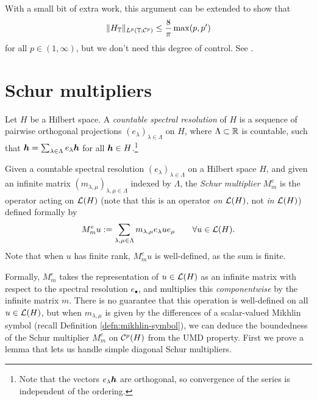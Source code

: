 \begin{rmk}
  With a small bit of extra work, this argument can be extended to show that
  \begin{equation*}
    \|H_{\mathbb{T}}\|_{L^p(\mathbb{T};\mathcal{C}^{p})} \leq \frac{8}{\pi} \max(p,p')
  \end{equation*}
  for all $p \in (1,\infty)$, but we don't need this degree of control.
  See \cite[Proposition 5.4.2]{HNVW16}.
\end{rmk}

\section{Schur multipliers}

Let $H$ be a Hilbert space.
A \emph{countable spectral resolution} of $H$ is a sequence of pairwise orthogonal projections $(e_{\lambda})_{\lambda \in \Lambda}$ on $H$, where $\Lambda \subset \mathbb{R}$ is countable, such that $\bm{h} = \sum_{\lambda \in \Lambda} e_{\lambda} \bm{h}$ for all $\bm{h} \in H$.\footnote{Note that the vectors $e_{\lambda} \bm{h}$ are orthogonal, so convergence of the series is independent of the ordering.}

\begin{defn}
  Given a countable spectral resolution $(e_{\lambda})_{\lambda \in \Lambda}$ on a Hilbert space $H$, and given an infinite matrix $(m_{\lambda,\mu})_{\lambda,\mu \in \Lambda}$ indexed by $\Lambda$, the \emph{Schur multiplier} $M_{m}^{e}$ is the operator acting on $\mathcal{L}(H)$ (note that this is an operator \emph{on} $\mathcal{L}(H)$, not \emph{in} $\mathcal{L}(H)$) defined formally by
  \begin{equation*}
    M_{m}^{e} u := \sum_{\lambda, \mu \in \Lambda} m_{\lambda,\mu} e_{\lambda} u e_{\mu} \qquad \forall u \in \mathcal{L}(H).
  \end{equation*}
  Note that when $u$ has finite rank, $M_{m}^{e} u$ is well-defined, as the sum is finite.
\end{defn}

Formally, $M_{m}^{e}$ takes the representation of $u \in \mathcal{L}(H)$ as an infinite matrix with respect to the spectral resolution $e_{\bullet}$, and multiplies this \emph{componentwise} by the infinite matrix $m$.
There is no guarantee that this operation is well-defined on all $u \in \mathcal{L}(H)$, but when $m_{\lambda,\mu}$ is given by the differences of a scalar-valued Mikhlin symbol (recall Definition \ref{defn:mikhlin-symbol}), we can deduce the boundedness of the Schur multiplier $M_{m}^{e}$ on $\mathcal{C}^{p}(H)$ from the UMD property.
First we prove a lemma that lets us handle simple diagonal Schur multipliers.

